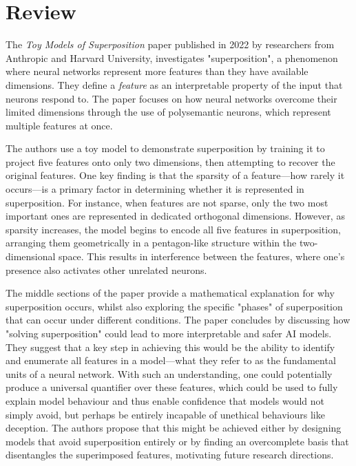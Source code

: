 \section{Review}
\label{sec:review}

The \textit{Toy Models of Superposition} paper \cite{elhage2022toy} published in 2022 by researchers from Anthropic and Harvard University, investigates "superposition", a phenomenon where neural networks represent more features than they have available dimensions.
They define a \textit{feature} as an interpretable property of the input that neurons respond to.
The paper focuses on how neural networks overcome their limited dimensions through the use of polysemantic neurons, which represent multiple features at once.

The authors use a toy model to demonstrate superposition by training it to project five features onto only two dimensions, then attempting to recover the original features.
One key finding is that the sparsity of a feature—how rarely it occurs—is a primary factor in determining whether it is represented in superposition. For instance, when features are not sparse, only the two most important ones are represented in dedicated orthogonal dimensions.
However, as sparsity increases, the model begins to encode all five features in superposition, arranging them geometrically in a pentagon-like structure within the two-dimensional space.
This results in interference between the features, where one's presence also activates other unrelated neurons.

The middle sections of the paper provide a mathematical explanation for why superposition occurs, whilst also exploring the specific "phases" of superposition that can occur under different conditions.
The paper concludes by discussing how "solving superposition" could lead to more interpretable and safer AI models.
They suggest that a key step in achieving this would be the ability to identify and enumerate all features in a model—what they refer to as the fundamental units of a neural network.
With such an understanding, one could potentially produce a universal quantifier over these features, which could be used to fully explain model behaviour and thus enable confidence that models would not simply avoid, but perhaps be entirely incapable of unethical behaviours like deception.
The authors propose that this might be achieved either by designing models that avoid superposition entirely or by finding an overcomplete basis that disentangles the superimposed features, motivating future research directions.

